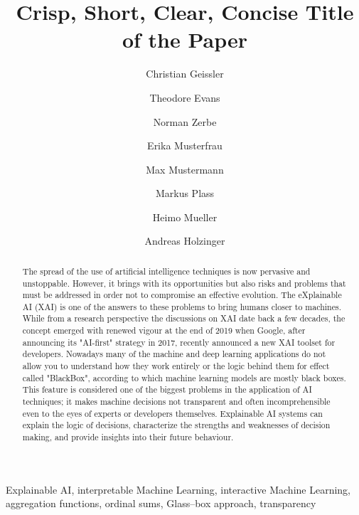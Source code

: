 \documentclass[a4paper,5p,review]{elsarticle}
\def\corref#1{}%
\begin{document}
\begin{frontmatter}

\title{Crisp, Short, Clear, Concise Title of the Paper}

\author[TUB]{Christian Geissler}
\author[TUB]{Theodore Evans}
\author[CAR]{Norman Zerbe}
\author[xxx]{Erika Musterfrau}
\author[xxx]{Max Mustermann}
\author[MUG]{Markus Plass}
\author[MUG]{Heimo Mueller}
\author[MUG,amii]{Andreas Holzinger \corref{mycorrespondingauthor}}

\address[MUG]{Medical University Graz, Austria}
\address[amii]{Alberta Machine Intelligence Institute, Canada}
\address[xxx]{Lab Name, University Name, Address}

\begin{abstract} 
The spread of the use of artificial intelligence techniques is now pervasive and unstoppable. However, it brings with its opportunities but also risks and problems that must be addressed in order not to compromise an effective evolution. The eXplainable AI (XAI) is one of the answers to these problems to bring humans closer to machines.
While from a research perspective the discussions on XAI date back a few decades, the concept emerged with renewed vigour at the end of 2019 when Google, after announcing its "AI-first" strategy in 2017, recently announced a new XAI toolset for developers. Nowadays many of the machine and deep learning applications do not allow you to understand how they work entirely or the logic behind them for effect called "BlackBox", according to which machine learning models are mostly black boxes. This feature is considered one of the biggest problems in the application of AI techniques; it makes machine decisions not transparent and often incomprehensible even to the eyes of experts or developers themselves. Explainable AI systems can explain the logic of decisions, characterize the strengths and weaknesses of decision making, and provide insights into their future behaviour.
\end{abstract}

\begin{keyword}
Explainable AI, interpretable Machine Learning, interactive Machine Learning, aggregation functions, ordinal sums, Glass--box approach, transparency 
\end{keyword}

\end{frontmatter}
\linenumbers
\end{document}
